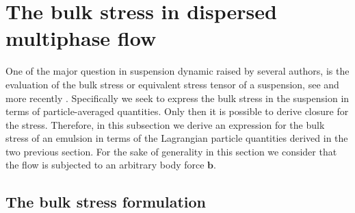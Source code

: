 

\section{The bulk stress in dispersed multiphase flow}



One of the major question in suspension dynamic raised by several authors, is the evaluation of the bulk stress or equivalent stress tensor of a suspension, see \citep{batchelor1970stress, prosperetti2006stress,zhang1997momentum,nadim1996concise} and more recently \citet{dolata2020heterogeneous}. 
Specifically we seek to express the bulk stress in the suspension in terms of particle-averaged quantities. 
Only then it is possible to derive closure for the stress. 
Therefore, in this subsection we derive an expression for the bulk stress of an emulsion in terms of the Lagrangian particle quantities derived in the two previous section. 
For the sake of generality in this section we consider that the flow is subjected to an arbitrary body force $\textbf{b}$. 

\subsection{The bulk stress formulation}

